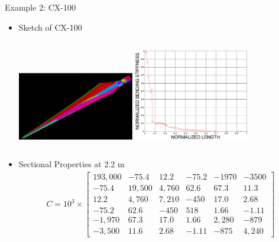 \documentclass[dvips,xcolor=cmyk]{beamer}
\begin{document}
\begin{frame}{Example 2: CX-100}
\begin{itemize}
\item Sketch of CX-100
    \begin{columns}[c]
    \column{2.0in}
     \includegraphics[width=2.0in]{EPSF/CX100Sketch.eps}
     \column{2.0in}
      \includegraphics[width=2.0in]{EPSF/normalized1.eps}
    \end{columns}
    
\item Sectional Properties at 2.2 m
    \scriptsize
    \begin{align*}
C =10^3 \times \begin{bmatrix}
	193,000 & -75.4   & 12.2   & -75.2  & -1970    & -3500    \\
	-75.4  & 19,500 & 4,760   & 62.6  & 67.3    & 11.3    \\
	12.2  & 4,760   & 7,210 & -450  & 17.0    & 2.68    \\
	-75.2  & 62.6   & -450   & 518 & 1.66    & -1.11    \\
	-1,970  & 67.3   & 17.0   & 1.66  & 2,280 & -879    \\
	-3,500  & 11.6   & 2.68   & -1.11  & -875    & 4,240
\end{bmatrix}
\end{align*}
\end{itemize}
\end{frame}
\end{document}
